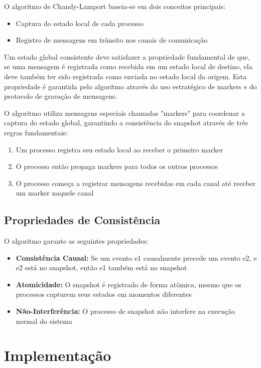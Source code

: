 \documentclass[12pt]{article}
\begin{document}
O algoritmo de Chandy-Lamport baseia-se em dois conceitos principais:
\begin{itemize}
    \item Captura do estado local de cada processo
    \item Registro de mensagens em trânsito nos canais de comunicação
\end{itemize}

Um estado global consistente deve satisfazer a propriedade fundamental de que, se uma mensagem é registrada como recebida em um estado local de destino, ela deve também ter sido registrada como enviada no estado local da origem. Esta propriedade é garantida pelo algoritmo através do uso estratégico de markers e do protocolo de gravação de mensagens.

O algoritmo utiliza mensagens especiais chamadas "markers" para coordenar a captura do estado global, garantindo a consistência do snapshot através de três regras fundamentais:

\begin{enumerate}
    \item Um processo registra seu estado local ao receber o primeiro marker
    \item O processo então propaga markers para todos os outros processos
    \item O processo começa a registrar mensagens recebidas em cada canal até receber um marker naquele canal
\end{enumerate}

\subsection{Propriedades de Consistência}

O algoritmo garante as seguintes propriedades:

\begin{itemize}
    \item \textbf{Consistência Causal:} Se um evento e1 causalmente precede um evento e2, e e2 está no snapshot, então e1 também está no snapshot
    \item \textbf{Atomicidade:} O snapshot é registrado de forma atômica, mesmo que os processos capturem seus estados em momentos diferentes
    \item \textbf{Não-Interferência:} O processo de snapshot não interfere na execução normal do sistema
\end{itemize}

\section{Implementação}
\end{document}
